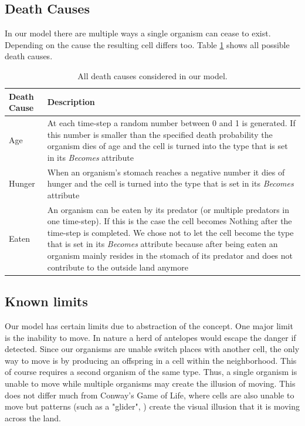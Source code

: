 \documentclass[11pt]{article}
\begin{document}
\subsection{Death Causes}
In our model there are multiple ways a single organism can cease to exist. Depending on the cause the resulting cell differs too. Table \ref{tab:deathCauses} shows all possible death causes.
\begin{table}[htbp]
\centering
\begin{tabular}{l|p{11cm}}
Death Cause & Description \\ 
\hline 
\hline 
Age & At each time-step a random number between 0 and 1 is generated. If this number is smaller than the specified death probability the organism dies of age and the cell is turned into the type that is set in its {\it Becomes} attribute\\ 
\hline 
Hunger & When an organism's stomach reaches a negative number it dies of hunger and the cell is turned into the type that is set in its {\it Becomes} attribute\\ 
\hline 
Eaten & An organism can be eaten by its predator (or multiple predators in one time-step). If this is the case the cell becomes Nothing after the time-step is completed. We chose not to let the cell become the type that is set in its {\it Becomes} attribute because after being eaten an organism mainly resides in the stomach of its predator and does not contribute to the outside land anymore\\  
\end{tabular}
\caption{All death causes considered in our model.}
\label{tab:deathCauses}
\end{table}

\subsection{Known limits}
\label{sec:knownLimits}
Our model has certain limits due to abstraction of the concept. One major limit is the inability to move. In nature a herd of antelopes would escape the danger if detected. Since our organisms are unable switch places with another cell, the only way to move is by producing an offspring in a cell within the neighborhood. This of course requires a second organism of the same type. Thus, a single organism is unable to move while multiple organisms may create the illusion of moving. This does not differ much from Conway's Game of Life, where cells are also unable to move but patterns (such as a "glider", \cite{gameOfLife}) create the visual illusion that it is moving across the land.
\end{document}
